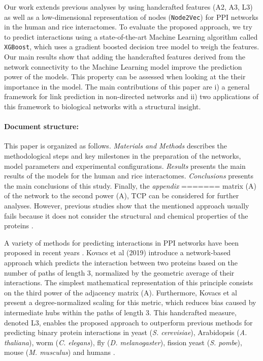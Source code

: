Our work extends previous analyses by using handcrafted features (A2,
A3, L3) as well as a low-dimensional representation of nodes 
(\texttt{Node2Vec})\cite{Grover_2016} for PPI networks in the human and rice 
interactomes. To evaluate the proposed approach, we try to predict interactions
using a state-of-the-art Machine Learning algorithm called \texttt{XGBoost}\cite{2016ChenXGB},
which uses a gradient boosted decision tree model to weigh the features.
Our main results show that adding the handcrafted features derived from the
network connectivity to the Machine Learning model improve the prediction
power of the models. This property can be assessed when looking at the their
importance in the model.  The main contributions of this paper are i) a
general framework for link prediction in non-directed networks and ii) two
applications of this framework to biological networks with a structural
insight.

\paragraph*{Document structure:} This paper is organized as follows. \emph{Materials and Methods} describes
the methodological steps and key milestones in the preparation of
the networks, model parameters and experimental configurations.
\emph{Results} presents the main results of the models for the human and rice interactomes.
\emph{Conclusions} presents the main conclusions of this study. Finally, the \emph{appendix}
=======
matrix (A) of the network to the second power (A\texttwosuperior ),
TCP can be considered for further analyses. However, previous studies
show that the mentioned approach usually fails because it does not
consider the structural and chemical properties of the proteins \cite{Cannistraci2013Networks,Kovacs2019}.

A variety of methods for predicting interactions in PPI networks have
been proposed in recent years \cite{Chang2016PPI,Chen2019PPI,Kotlyar2015PPI}.
Kovacs et al (2019) introduce a network-based approach which predicts
the interaction between two proteins based on the number of paths
of length 3, normalized by the geometric average of their interactions.
The simplest mathematical representation of this principle consists
on the third power of the adjacency matrix (A\textthreesuperior).
Furthermore, Kovacs et al present a degree-normalized scaling for
this metric, which reduces bias caused by intermediate hubs within
the paths of length 3. This handcrafted measure, denoted L3, enables
the proposed approach to outperform previous methods for predicting
binary protein interactions in yeast (\emph{S. cerevisiae}), Arabidopsis
(\emph{A. thaliana}), worm (\emph{C. elegans}), fly (\emph{D. melanogaster}),
fission yeast (\emph{S. pombe}), mouse (\emph{M. musculus}) and humans
\cite{Kovacs2019}.


